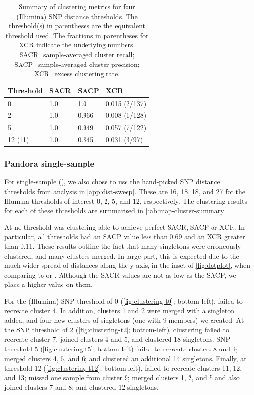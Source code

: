 \begin{table}
\centering
\begin{tabular}{@{}llll@{}}
\toprule
Threshold & SACR & SACP  & XCR           \\ \midrule
0         & 1.0  & 1.0   & 0.015 (2/137) \\
2         & 1.0  & 0.966 & 0.008 (1/128) \\
5         & 1.0  & 0.949 & 0.057 (7/122) \\
12 (11)   & 1.0  & 0.845 & 0.031 (3/97)  \\ \bottomrule
\end{tabular}
\caption{Summary of \bcftools{} clustering metrics for four (Illumina) SNP distance thresholds. The threshold(s) in parentheses are the \ont{} equivalent threshold used. The fractions in parentheses for XCR indicate the underlying numbers. SACR=sample-averaged cluster recall; SACP=sample-averaged cluster precision; XCR=excess clustering rate.}
\label{tab:bcftools-cluster-summary}
\end{table}

\subsubsection{Pandora single-sample}

For \pandora{} single-sample (\map{}), we also chose to use the hand-picked SNP distance thresholds from analysis in \autoref{app:dist-sweep}. These are 16, 18, 18, and 27 for the Illumina thresholds of interest 0, 2, 5, and 12, respectively. The clustering results for each of these thresholds are summarised in \autoref{tab:map-cluster-summary}. 

At no threshold was \map{} clustering able to achieve perfect SACR, SACP or XCR. In particular, all thresholds had an SACP value less than 0.69 and an XCR greater than 0.11. These results outline the fact that many singletons were erroneously clustered, and many clusters merged. In large part, this is expected due to the much wider spread of distances along the y-axis, in the inset of \autoref{fig:dotplot}, when comparing \map{} to \bcftools{} or \compare{}. Although the SACR values are not as low as the SACP, we place a higher value on them. 

For the (Illumina) SNP threshold of 0 (\autoref{fig:clustering-t0}; bottom-left), \map{} failed to recreate cluster 4. In addition, clusters 1 and 2 were merged with a singleton added, and four new clusters of singletons (one with 9 members) we created. At the SNP threshold of 2 (\autoref{fig:clustering-t2}; bottom-left), \map{} clustering failed to recreate cluster 7, joined clusters 4 and 5, and clustered 18 singletons. SNP threshold 5 (\autoref{fig:clustering-t5}; bottom-left) failed to recreate clusters 8 and 9; merged clusters 4, 5, and 6; and clustered an additional 14 singletons. Finally, at threshold 12 (\autoref{fig:clustering-t12}; bottom-left), \map{} failed to recreate clusters 11, 12, and 13; missed one sample from cluster 9; merged clusters 1, 2, and 5 and also joined clusters 7 and 8; and clustered 12 singletons. 

